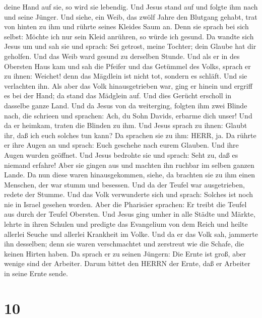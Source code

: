 deine Hand auf sie, so wird sie lebendig.  Und Jesus stand
auf und folgte ihm nach und seine Jünger.  Und siehe, ein
Weib, das zwölf Jahre den Blutgang gehabt, trat von hinten zu ihm und
rührte seines Kleides Saum an.  Denn sie sprach bei sich
selbst: Möchte ich nur sein Kleid anrühren, so würde ich gesund.
 Da wandte sich Jesus um und sah sie und sprach: Sei
getrost, meine Tochter; dein Glaube hat dir geholfen. Und das Weib ward
gesund zu derselben Stunde.  Und als er in des Obersten
Haus kam und sah die Pfeifer und das Getümmel des Volks, 
sprach er zu ihnen: Weichet! denn das Mägdlein ist nicht tot, sondern es
schläft. Und sie verlachten ihn.  Als aber das Volk
hinausgetrieben war, ging er hinein und ergriff es bei der Hand; da
stand das Mädglein auf.  Und dies Gerücht erscholl in
dasselbe ganze Land.  Und da Jesus von da weiterging,
folgten ihm zwei Blinde nach, die schrieen und sprachen: Ach, du Sohn
Davids, erbarme dich unser!  Und da er heimkam, traten die
Blinden zu ihm. Und Jesus sprach zu ihnen: Glaubt ihr, daß ich euch
solches tun kann? Da sprachen sie zu ihm: HERR, ja.  Da
rührte er ihre Augen an und sprach: Euch geschehe nach eurem Glauben.
 Und ihre Augen wurden geöffnet. Und Jesus bedrohte sie und
sprach: Seht zu, daß es niemand erfahre!  Aber sie gingen
aus und machten ihn ruchbar im selben ganzen Lande.  Da nun
diese waren hinausgekommen, siehe, da brachten sie zu ihm einen
Menschen, der war stumm und besessen.  Und da der Teufel
war ausgetrieben, redete der Stumme. Und das Volk verwunderte sich und
sprach: Solches ist noch nie in Israel gesehen worden. 
Aber die Pharisäer sprachen: Er treibt die Teufel aus durch der Teufel
Obersten.  Und Jesus ging umher in alle Städte und Märkte,
lehrte in ihren Schulen und predigte das Evangelium von dem Reich und
heilte allerlei Seuche und allerlei Krankheit im Volke. 
Und da er das Volk sah, jammerte ihn desselben; denn sie waren
verschmachtet und zerstreut wie die Schafe, die keinen Hirten haben.
 Da sprach er zu seinen Jüngern: Die Ernte ist groß, aber
wenige sind der Arbeiter.  Darum bittet den HERRN der
Ernte, daß er Arbeiter in seine Ernte sende.

\hypertarget{section-9}{%
\section{10}\label{section-9}}

